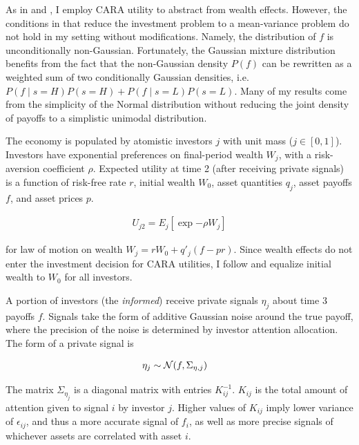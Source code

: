 \documentclass{article}
\begin{document}
As in \textcite{admati_noisy_1985} and \textcite{kacperczyk_rational_2016}, I employ CARA utility to abstract from wealth effects. However, the conditions in \textcite{kacperczyk_rational_2016} that reduce the investment problem to a mean-variance problem do not hold in my setting without modifications. Namely, the distribution of $f$ is unconditionally non-Gaussian. Fortunately, the Gaussian mixture distribution benefits from the fact that the non-Gaussian density $P(f)$ can be rewritten as a weighted sum of two conditionally Gaussian densities, i.e. $P(f \mid s=H)P(s=H) + P(f \mid s=L) P(s=L)$. Many of my results come from the simplicity of the Normal distribution without reducing the joint density of payoffs to a simplistic unimodal distribution.

The economy is populated by atomistic investors $j$ with unit mass ($j \in [0, 1]$). Investors have exponential preferences on final-period wealth $W_j$, with a risk-aversion coefficient $\rho$. Expected utility at time 2 (after receiving private signals) is a function of risk-free rate $r$, initial wealth $W_0$, asset quantities $q_j$, asset payoffs $f$, and asset prices $p$.

\begin{align}
    U_{j2} = E_j[\exp{-\rho W_j}]
\end{align}

\noindent for law of motion on wealth $W_j = r W_0 + q'_j (f - pr)$. Since wealth effects do not enter the investment decision for CARA utilities, I follow  \textcite{kacperczyk_rational_2016} and equalize initial wealth to $W_0$ for all investors.

A portion of investors (the \textit{informed}) receive private signals $\eta_j$ about time 3 payoffs $f$. Signals take the form of additive Gaussian noise around the true payoff, where the precision of the noise is determined by investor attention allocation. The form of a private signal is

\begin{align}
    \eta_j &\sim \mathcal{N}(f, \Sigma_{\eta,j})
\end{align}

\noindent The matrix $\Sigma_{\eta_j}$ is a diagonal matrix with entries $K_{ij}^{-1}$. $K_{ij}$ is the total amount of attention given to signal $i$ by investor $j$. Higher values of $K_{ij}$ imply lower variance of $\epsilon_{ij}$, and thus a more accurate signal of $f_i$, as well as more precise signals of whichever assets are correlated with asset $i$.
\end{document}
